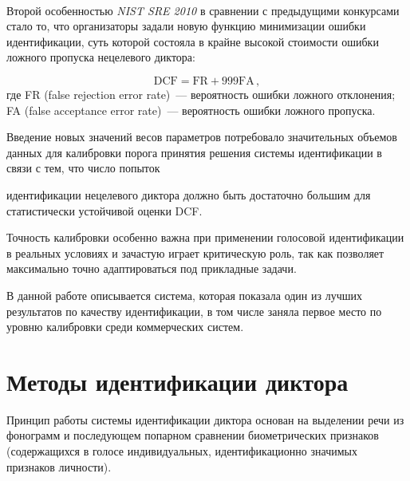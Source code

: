 \begin{multicols}{2}
  \begin{figure*} %
   \vspace*{1pt}
 \begin{center}
 \mbox{%
 \epsfxsize=150.382mm
 }
 \end{center}
 \vspace*{-9pt}
  \end{figure*}

  Второй особенностью \textit{NIST SRE 2010} в сравнении с предыдущими 
конкурсами стало то, что организаторы задали новую функцию минимизации 
ошибки идентификации, суть которой состояла в крайне высокой стоимости 
ошибки ложного пропуска нецелевого диктора:

\noindent
  $$
\mathrm{DCF = FR + 999 FA}\,,
$$
где FR (false rejection error rate)~--- вероятность \mbox{ошибки} ложного отклонения;
FA (false acceptance error rate)~--- вероятность ошибки ложного про\-пуска.

  Введение новых значений весов параметров потребовало значительных 
объемов данных для калиб\-ров\-ки порога принятия решения системы 
идентификации в связи с тем, что число попыток\linebreak\vspace*{-12pt}
\pagebreak

\noindent идентификации нецелевого 
диктора должно быть достаточно большим для статистически устойчивой оценки 
DCF. 
  
  Точность калибровки особенно важна при применении голосовой 
идентификации в реальных условиях и зачастую играет критическую роль, так как 
позволяет максимально точно адаптироваться под прикладные задачи.
  
  В данной работе описывается система, которая показала один из лучших 
результатов по качеству идентификации, в том числе заняла первое место по 
уровню калибровки среди коммерческих систем.
  
\section{Методы идентификации диктора}

  Принцип работы системы идентификации диктора основан на выделении речи 
из фонограмм и последующем попарном сравнении биометрических признаков 
(содержащихся в голосе индивидуальных, идентификационно значимых 
признаков личности). 
  

\end{multicols}
